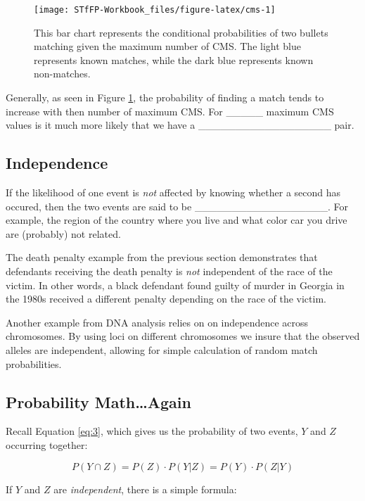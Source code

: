 \documentclass[]{book}
\theoremstyle{definition}
\theoremstyle{definition}
\theoremstyle{remark}
\begin{document}
\begin{figure}[h]

{\centering \texttt{[image: STfFP-Workbook\_files/figure-latex/cms-1]} 

}

\caption{This bar chart represents the conditional probabilities of two bullets matching given the maximum number of CMS. The light blue represents known matches, while the dark blue represents known non-matches.}\label{fig:cms}
\end{figure}

Generally, as seen in Figure \ref{fig:cms}, the probability of finding a
match tends to increase with then number of maximum CMS. For \_\_\_\_\_
maximum CMS values is it much more likely that we have a
\_\_\_\_\_\_\_\_\_\_\_\_\_\_\_\_\_\_ pair.

\subsection{Independence}\label{independence}

If the likelihood of one event is \emph{not} affected by knowing whether
a second has occured, then the two events are said to be
\_\_\_\_\_\_\_\_\_\_\_\_\_\_\_\_\_\_. For example, the region of the
country where you live and what color car you drive are (probably) not
related.

The death penalty example from the previous section demonstrates that
defendants receiving the death penalty is \emph{not} independent of the
race of the victim. In other words, a black defendant found guilty of
murder in Georgia in the 1980s received a different penalty depending on
the race of the victim.

Another example from DNA analysis relies on on independence across
chromosomes. By using loci on different chromosomes we insure that the
observed alleles are independent, allowing for simple calculation of
random match probabilities.

\subsection{Probability Math\ldots{}Again}\label{probability-mathagain}

Recall Equation \ref{eq:3}, which gives us the probability of two
events, \(Y\) and \(Z\) occurring together:

\[ P(Y \cap Z) = P(Z)\cdot P(Y|Z) = P(Y) \cdot P(Z|Y) \]

If \(Y\) and \(Z\) are \emph{independent}, there is a simple formula:
\end{document}

